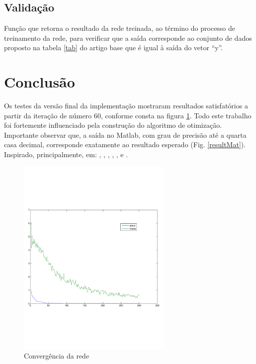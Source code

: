 \documentclass{IEEEtran}
\begin{document}
\subsection{Validação}
	Função que retorna o resultado da rede treinada, ao término do processo de treinamento da  rede, para verificar que a saída corresponde ao conjunto de dados proposto na tabela \ref{tab} do artigo base que é igual à saída do vetor ``y''. 


\section{Conclusão}
Os testes da versão final  da implementação mostraram resultados satisfatórios a partir da iteração de número 60, conforme consta na figura \ref{res}.
Todo este trabalho foi fortemente influenciado pela construção do algoritmo de otimização. Importante observar que, a saída no Matlab, com grau de precisão até a quarta casa decimal, corresponde exatamente ao resultado esperado (Fig. \ref{resultMat}). Inspirado, principalmente, em: \cite{del2008particle}, \cite{zhang2008active}, \cite{sedlaczek2006using}, \cite{molga2005test}, \cite{chapman2008using}, \cite{clerc2002particle} e \cite{eberhart2001particle}. 
\begin{figure}[ht!]
	\centering
	\includegraphics[width=75mm]{res.pdf}
	\caption{Convergência da rede}
	\label{res}
\end{figure}
\end{document}
